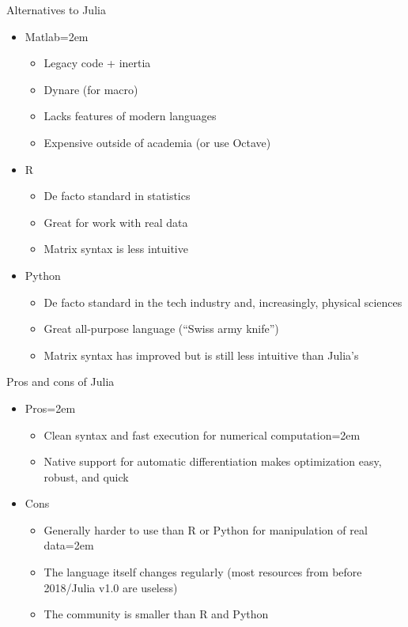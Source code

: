 \documentclass[handout]{beamer}
\begin{document}
\begin{frame}{Alternatives to Julia}
\begin{itemize}
    \item Matlab\itemsep=2em
    \begin{itemize}
        \item Legacy code + inertia
        \item Dynare (for macro)
        \item Lacks features of modern languages
        \item Expensive outside of academia (or use Octave)
    \end{itemize}
    \item<2-> R
    \begin{itemize}
        \item De facto standard in statistics
        \item Great for work with real data
        \item Matrix syntax is less intuitive
    \end{itemize}
    \item<3-> Python
    \begin{itemize}
        \item De facto standard in the tech industry and, increasingly, physical sciences
        \item Great all-purpose language (``Swiss army knife'')
        \item Matrix syntax has improved but is still less intuitive than Julia's
    \end{itemize}
\end{itemize}
\end{frame}

\begin{frame}{Pros and cons of Julia}
\begin{itemize}
    \item Pros\itemsep=2em
    \begin{itemize}
        \item Clean syntax and fast execution for numerical computation\itemsep=2em
        \item Native support for automatic differentiation makes optimization easy, robust, and quick
    \end{itemize}
    \item<2-> Cons
    \begin{itemize}
        \item Generally harder to use than R or Python for manipulation of real data\itemsep=2em
        \item The language itself changes regularly (most resources from before 2018/Julia v1.0 are useless)
        \item The community is smaller than R and Python
    \end{itemize}
\end{itemize}
\end{frame}
\end{document}
